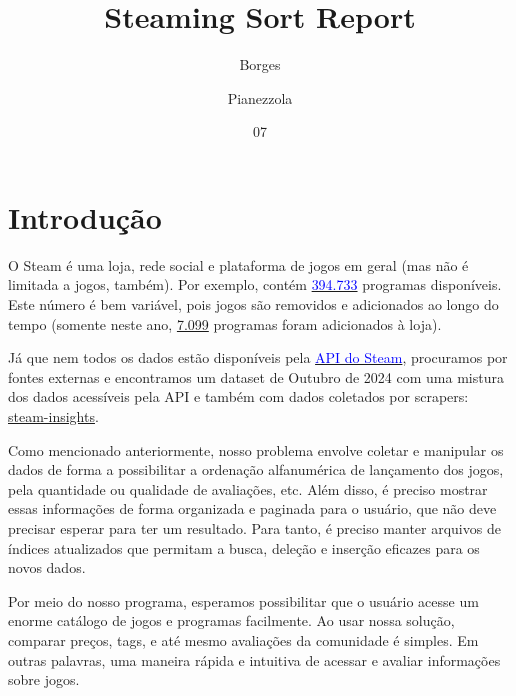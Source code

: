 \documentclass[ecp,tc]{iiufrgs}
\title{Steaming Sort Report}
\author{Borges}{Julio Augusto de Castilhos} %
\author{Pianezzola}{Vicente} %
\date{07}{2025}
\begin{document}
\maketitle    


\tableofcontents







%
\chapter{Introdução}
O Steam é uma loja, rede social e plataforma de jogos em geral (mas não
é limitada a jogos, também). Por exemplo, contém
\href{https://steamdb.info/\#stats}{\textcolor{blue}{394.733}} programas disponíveis. Este
número é bem variável, pois jogos são removidos e adicionados ao longo
do tempo (somente neste ano, \href{https://steamdb.info/\#stats}{7.099}
programas foram adicionados à loja).

Já que nem todos os dados estão disponíveis pela
\href{https://developer.valvesoftware.com/wiki/Steam_Web_API}{\textcolor{blue}{API do
Steam}}, procuramos por fontes externas e encontramos um dataset de
Outubro de 2024 com uma mistura dos dados acessíveis pela API e também
com dados coletados por scrapers:
\href{https://github.com/NewbieIndieGameDev/steam-insights}{steam-insights}.

Como mencionado anteriormente, nosso problema envolve coletar e
manipular os dados de forma a possibilitar a ordenação alfanumérica de
lançamento dos jogos, pela quantidade ou qualidade de avaliações, etc.
Além disso, é preciso mostrar essas informações de forma organizada e
paginada para o usuário, que não deve precisar esperar para ter um
resultado. Para tanto, é preciso manter arquivos de índices atualizados
que permitam a busca, deleção e inserção eficazes para os novos dados.

Por meio do nosso programa, esperamos possibilitar que o usuário acesse
um enorme catálogo de jogos e programas facilmente. Ao usar nossa
solução, comparar preços, tags, e até mesmo avaliações da comunidade é
simples. Em outras palavras, uma maneira rápida e intuitiva de acessar e
avaliar informações sobre jogos.
\end{document}
